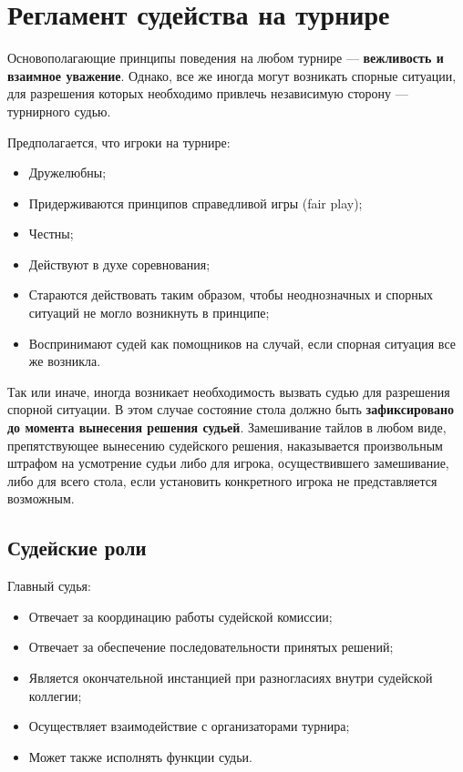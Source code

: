 \section{Регламент судейства на турнире}

Основополагающие принципы поведения на любом турнире --- \textbf{вежливость и взаимное уважение}. Однако, все же иногда могут возникать спорные ситуации, для разрешения которых необходимо привлечь независимую сторону --- турнирного судью.

Предполагается, что игроки на турнире:
\begin{itemize}
	\item Дружелюбны;
	\item Придерживаются принципов справедливой игры (fair play);
	\item Честны;
	\item Действуют в духе соревнования;
	\item Стараются действовать таким образом, чтобы неоднозначных и спорных ситуаций не могло возникнуть в принципе;
	\item Воспринимают судей как помощников на случай, если спорная ситуация все же возникла.
\end{itemize}

Так или иначе, иногда возникает необходимость вызвать судью для разрешения спорной ситуации. В этом случае состояние стола должно быть \textbf{зафиксировано до момента вынесения решения судьей}. Замешивание тайлов в любом виде, препятствующее вынесению судейского решения, наказывается произвольным штрафом на усмотрение судьи либо для игрока, осуществившего замешивание, либо для всего стола, если установить конкретного игрока не представляется возможным.

\subsection{Судейские роли}

Главный судья:
\begin{itemize}
	\item Отвечает за координацию работы судейской комиссии;
	\item Отвечает за обеспечение последовательности принятых решений;
	\item Является окончательной инстанцией при разногласиях внутри судейской коллегии;
	\item Осуществляет взаимодействие с организаторами турнира;
	\item Может также исполнять функции судьи.
\end{itemize}

